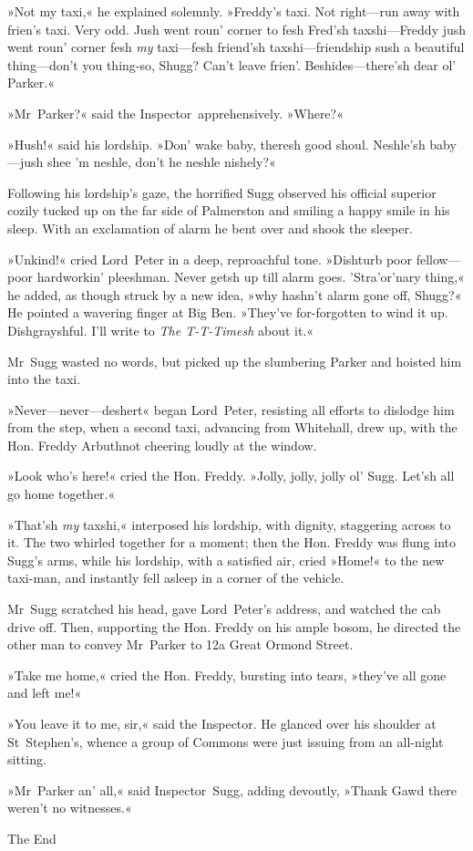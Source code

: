 »Not my taxi,« he explained solemnly. »Freddy's taxi. Not right—run away with frien's taxi. Very odd. Jush went roun' corner to fesh Fred'sh taxshi—Freddy jush went roun' corner fesh \textit{my} taxi—fesh friend'sh taxshi—friendship sush a beautiful thing—don't you thing-so, Shugg? Can't leave frien'. Beshides—there'sh dear ol' Parker.«

»Mr~Parker?« said the Inspector~apprehensively. »Where?«

»Hush!« said his lordship. »Don' wake baby, theresh good shoul.  Neshle'sh baby—jush shee 'm neshle, don't he neshle nishely?«

Following his lordship's gaze, the horrified Sugg observed his official superior cozily tucked up on the far side of Palmerston and smiling a happy smile in his sleep. With an exclamation of alarm he bent over and shook the sleeper.

»Unkind!« cried Lord~Peter in a deep, reproachful tone. »Dishturb poor fellow—poor hardworkin' pleeshman. Never getsh up till alarm goes\textellipsis .  'Stra'or'nary thing,« he added, as though struck by a new idea, »why hashn't alarm gone off, Shugg?« He pointed a wavering finger at Big Ben. »They've for-forgotten to wind it up. Dishgrayshful. I'll write to \textit{The T-T-Timesh} about it.«

Mr~Sugg wasted no words, but picked up the slumbering Parker and hoisted him into the taxi.

»Never—never—deshert\longdash« began Lord~Peter, resisting all efforts to dislodge him from the step, when a second taxi, advancing from Whitehall, drew up, with the Hon. Freddy Arbuthnot cheering loudly at the window.

»Look who's here!« cried the Hon. Freddy. »Jolly, jolly, jolly ol' Sugg. Let'sh all go home together.«

»That'sh \textit{my} taxshi,« interposed his lordship, with dignity, staggering across to it. The two whirled together for a moment; then the Hon. Freddy was flung into Sugg's arms, while his lordship, with a satisfied air, cried »Home!« to the new taxi-man, and instantly fell asleep in a corner of the vehicle.

Mr~Sugg scratched his head, gave Lord~Peter's address, and watched the cab drive off. Then, supporting the Hon. Freddy on his ample bosom, he directed the other man to convey Mr~Parker to 12a Great Ormond Street.

»Take me home,« cried the Hon. Freddy, bursting into tears, »they've all gone and left me!«

»You leave it to me, sir,« said the Inspector. He glanced over his shoulder at St~Stephen's, whence a group of Commons were just issuing from an all-night sitting.

»Mr~Parker an' all,« said Inspector~Sugg, adding devoutly, »Thank Gawd there weren't no witnesses.«
\vfill

\begin{center}\mytitlefont\Huge
	The End
\end{center}